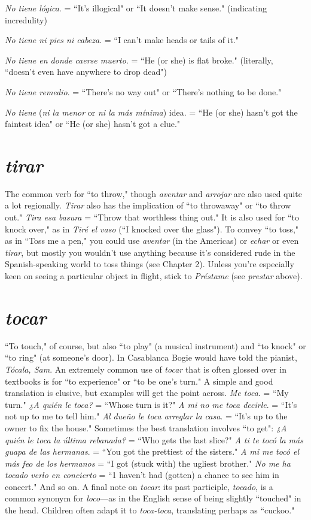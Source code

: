 \indu \emph{No tiene lógica}. = ``It's illogical" or ``It doesn't make sense."
(indicating incredulity)

\indu \emph{No tiene ni pies ni cabeza}. = ``I can't make heads or tails of it."

\indu \emph{No tiene en donde caerse muerto}. = ``He (or she) is flat
broke."
(literally, ``doesn't even have anywhere to drop dead")

\indu \emph{No tiene remedio}. = ``There's no way out" or ``There's nothing to be done."

\indu \emph{No tiene} (\emph{ni la menor} or \emph{ni la más mínima}) idea. = ``He (or
she) hasn't got the faintest idea" or ``He (or she) hasn't
got a clue."

\section{\emph{tirar}}

The common verb for ``to throw," though \emph{aventar} and \emph{arrojar}
are also used quite a lot regionally. \emph{Tirar} also has the implication of
``to throwaway" or ``to throw out." \emph{Tira esa basura} = ``Throw that
worthless thing out." It is also used for ``to knock over," as in \emph{Tiré el
	vaso} (``I knocked over the glass"). To convey ``to toss," as in ``Toss me
a pen," you could use \emph{aventar} (in the Americas) or \emph{echar} or even \emph{tirar},
but mostly you wouldn't use anything because it's considered rude
in the Spanish-speaking world to toss things (see Chapter 2). Unless
you're especially keen on seeing a particular object in flight, stick to
\emph{Préstame} (see \emph{prestar} above).

\section{\emph{tocar}}

``To touch," of course, but also ``to play" (a musical instrument) and ``to knock" or ``to ring" (at someone's door). In Casablanca
Bogie would have told the pianist, \emph{Tócala, Sam}. An extremely common use of \emph{tocar} that is often glossed over in textbooks is for ``to experience" or ``to be one's turn." A simple and good translation is elusive,
but examples will get the point across. \emph{Me toca}. = ``My turn." \emph{¿A
	quién le toca?} = ``Whose turn is it?" \emph{A mi no me toca decirle}. = ``It's
not up to me to tell him." \emph{Al dueño le toca arreglar la casa}. = ``It's
up to the owner to fix the house." Sometimes the best translation involves ``to get": \emph{¿A quién le toca la última rebanada?} = ``Who gets the
last slice?" \emph{A ti te tocó la más guapa de las hermanas}. = ``You got the
prettiest of the sisters." \emph{A mi me tocó el más feo de los hermanos} =
``I got (stuck with) the ugliest brother." \emph{No me ha tocado verlo en concierto} = ``1 haven't had (gotten) a chance to see him in concert." And
so on. A final note on \emph{tocar}: its past participle, \emph{tocado}, is a common
synonym for \emph{loco}---as in the English sense of being slightly ``touched"
in the head. Children often adapt it to \emph{toca-toca}, translating perhaps as
``cuckoo."

